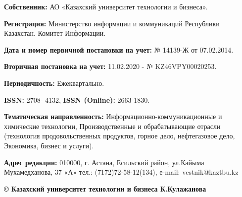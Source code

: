 {\textbf{Собственник:} АО «Казахский университет технологии и бизнеса».

\textbf{Регистрация:} Министерство информации и коммуникаций Республики
Казахстан. Комитет Информации.

\textbf{Дата и номер первичной постановки на учет:} № 14139-Ж от
07.02.2014.

\textbf{Вторичная постановка на учет:} 11.02.2020 - № KZ46VPY00020253.

\textbf{Периодичность:} Ежеквартально.

\textbf{ISSN:} 2708- 4132, \textbf{ISSN (Online):} 2663-1830.

\textbf{Тематическая направленность:} Информационно-коммуникационные и
химические технологии, Производственные и обрабатывающие отрасли (технология
продовольственных продуктов, горное дело, нефтегазовое дело, Экономика, бизнес и
услуги).

\textbf{Адрес редакции:} 010000, г. Астана, Есильский район, ул.Кайыма
Мухамедханова, 37 «А» тел.: (7172)72-58-12(134), е-mail: vestnik@kaztbu.kz
\vfill
\begin{center}
\textbf{\normalsize © Казахский университет технологии и бизнеса К.Кулажанова}
\end{center}
}
\pagebreak
